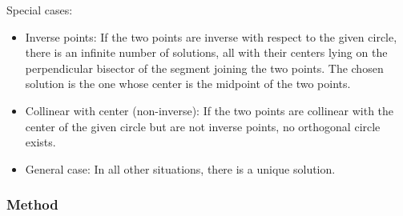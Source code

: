 \medskip
\noindent
Special cases:
\begin{itemize}
\item Inverse points:
If the two points are inverse with respect to the given circle, there is an infinite number of solutions, all with their centers lying on the perpendicular bisector of the segment joining the two points.
The chosen solution is the one whose center is the midpoint of the two points.

\item Collinear with center (non-inverse):
If the two points are collinear with the center of the given circle but are not inverse points, no orthogonal circle exists.

\item General case:
In all other situations, there is a unique solution.
\end{itemize}

\vspace{1em}
\begin{minipage}{.5\textwidth}
\begin{center}
\end{center}
\end{minipage}
\begin{minipage}{.5\textwidth}
\begin{tkzexample}
\end{tkzexample}
\end{minipage}


\subsubsection{Method } %
\label{ssub:radical_circle}

